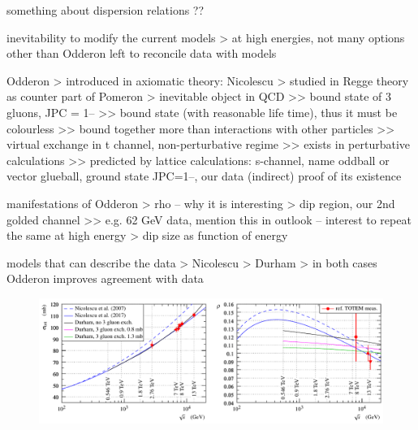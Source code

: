 \bgroup
\parskip=0pt

\> something about dispersion relations ??

\> inevitability to modify the current models
\>> at high energies, not many options other than Odderon left to reconcile data with models

\> Odderon
\>> introduced in axiomatic theory: Nicolescu
\>> studied in Regge theory as counter part of Pomeron
\>> inevitable object in QCD 
\>>> bound state of 3 gluons, JPC = 1--
\>>> bound state (with reasonable life time), thus it must be colourless
\>>> bound together more than interactions with other particles
\>>> virtual exchange in t channel, non-perturbative regime
\>>> exists in perturbative calculations
\>>> predicted by lattice calculations: s-channel, name oddball or vector glueball, ground state JPC=1--, our data (indirect) proof of its existence

\> manifestations of Odderon
\>> rho -- why it is interesting
\>> dip region, our 2nd golded channel
\>>> e.g. 62 GeV data, mention this in outlook -- interest to repeat the same at high energy
\>> dip size as function of energy

\> models that can describe the data
\>> Nicolescu
\>> Durham
\>> in both cases Odderon improves agreement with data
\egroup






\begin{figure}
\vskip-5mm
\begin{center}
\includegraphics{fig/matching_models_si_tot_rho.pdf}
\caption{%
}
\label{fig:match models}
\end{center}
\end{figure}
